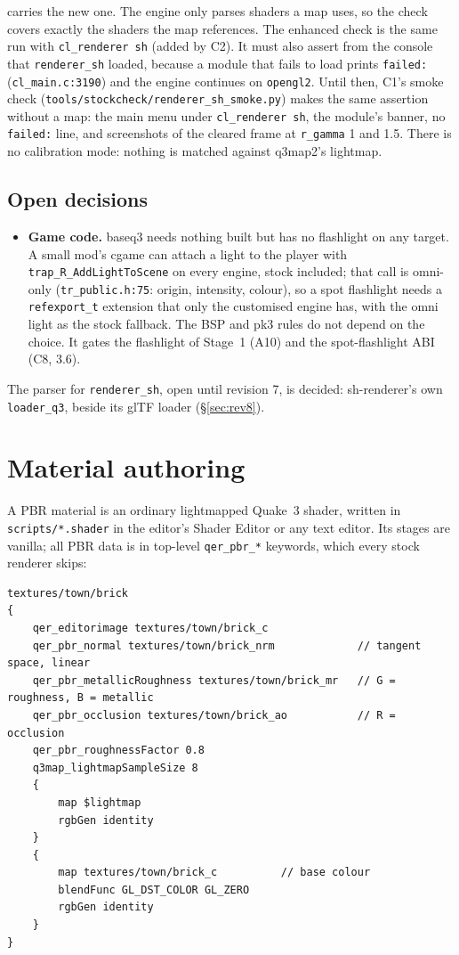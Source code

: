 \documentclass[11pt,a4paper]{article}
\begin{document}
carries the new one. The engine only parses shaders a map uses, so the check covers exactly the
shaders the map references. The enhanced check is the same run with \texttt{cl\_renderer sh}
(added by C2). It must also assert from the console that \texttt{renderer\_sh} loaded, because a
module that fails to load prints \texttt{failed:} (\texttt{cl\_main.c:3190}) and the engine
continues on \texttt{opengl2}. Until then, C1's smoke check
(\texttt{tools/stockcheck/renderer\_sh\_smoke.py}) makes the same assertion without a map: the
main menu under \texttt{cl\_renderer sh}, the module's banner, no \texttt{failed:} line, and
screenshots of the cleared frame at \texttt{r\_gamma} 1 and 1.5.
There is no calibration mode: nothing is matched against q3map2's lightmap.

\subsection{Open decisions}\label{sec:open}

\begin{itemize}
\item \textbf{Game code.} baseq3 needs nothing built but has no flashlight on any target. A small
  mod's cgame can attach a light to the player with \texttt{trap\_R\_AddLightToScene} on every
  engine, stock included; that call is omni-only (\texttt{tr\_public.h:75}: origin, intensity,
  colour), so a spot flashlight needs a \texttt{refexport\_t} extension that only the customised
  engine has, with the omni light as the stock fallback. The BSP and pk3 rules do not depend on the
  choice. It gates the flashlight of Stage~1 (A10) and the spot-flashlight ABI (C8, 3.6).
\end{itemize}
The parser for \texttt{renderer\_sh}, open until revision 7, is decided: sh-renderer's own
\texttt{loader\_q3}, beside its glTF loader (§\ref{sec:rev8}).

\section{Material authoring}\label{sec:materials}

A PBR material is an ordinary lightmapped Quake~3 shader, written in \texttt{scripts/*.shader} in
the editor's Shader Editor or any text editor. Its stages are vanilla; all PBR data is in top-level
\texttt{qer\_pbr\_*} keywords, which every stock renderer skips:

\begin{verbatim}
textures/town/brick
{
    qer_editorimage textures/town/brick_c
    qer_pbr_normal textures/town/brick_nrm             // tangent space, linear
    qer_pbr_metallicRoughness textures/town/brick_mr   // G = roughness, B = metallic
    qer_pbr_occlusion textures/town/brick_ao           // R = occlusion
    qer_pbr_roughnessFactor 0.8
    q3map_lightmapSampleSize 8
    {
        map $lightmap
        rgbGen identity
    }
    {
        map textures/town/brick_c          // base colour
        blendFunc GL_DST_COLOR GL_ZERO
        rgbGen identity
    }
}
\end{verbatim}
\end{document}
